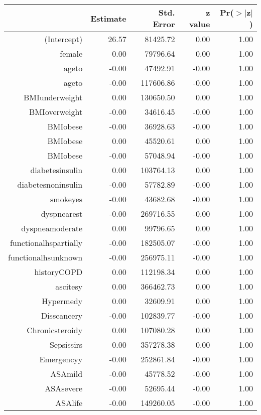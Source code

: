 \bigskip\bigskip
\centering
\begin{tabular}{rrrrr}
  \hline
 & Estimate & Std. Error & z value & Pr($>$$|$z$|$) \\ 
  \hline
(Intercept) & 26.57 & 81425.72 & 0.00 & 1.00 \\ 
  female & 0.00 & 79796.64 & 0.00 & 1.00 \\ 
  age\-65\-to\-74 & -0.00 & 47492.91 & -0.00 & 1.00 \\ 
  age\-75\-to\-84 & -0.00 & 117606.86 & -0.00 & 1.00 \\ 
  BMI\-underweight & 0.00 & 130650.50 & 0.00 & 1.00 \\ 
  BMI\-overweight & -0.00 & 34616.45 & -0.00 & 1.00 \\ 
  BMI\-obese\-1 & -0.00 & 36928.63 & -0.00 & 1.00 \\ 
  BMI\-obese\-2 & 0.00 & 45520.61 & 0.00 & 1.00 \\ 
  BMI\-obese\-3 & -0.00 & 57048.94 & -0.00 & 1.00 \\ 
  diabetes\-insulin & 0.00 & 103764.13 & 0.00 & 1.00 \\ 
  diabetes\-noninsulin & -0.00 & 57782.89 & -0.00 & 1.00 \\ 
  smoke\-yes & -0.00 & 43682.68 & -0.00 & 1.00 \\ 
  dyspnea\-rest & -0.00 & 269716.55 & -0.00 & 1.00 \\ 
  dyspnea\-moderate & 0.00 & 99796.65 & 0.00 & 1.00 \\ 
  functional\-hs\-partially & -0.00 & 182505.07 & -0.00 & 1.00 \\ 
  functional\-hs\-unknown & -0.00 & 256975.11 & -0.00 & 1.00 \\ 
  history\-COPD & 0.00 & 112198.34 & 0.00 & 1.00 \\ 
  ascites\-y & 0.00 & 366462.73 & 0.00 & 1.00 \\ 
  Hyper\-med\-y & 0.00 & 32609.91 & 0.00 & 1.00 \\ 
  Diss\-cancer\-y & -0.00 & 102839.77 & -0.00 & 1.00 \\ 
  Chronic\-steroid\-y & 0.00 & 107080.28 & 0.00 & 1.00 \\ 
  Sepsis\-sirs & 0.00 & 357278.38 & 0.00 & 1.00 \\ 
  Emergency\-y & -0.00 & 252861.84 & -0.00 & 1.00 \\ 
  ASA\-mild & -0.00 & 45778.52 & -0.00 & 1.00 \\ 
  ASA\-severe & -0.00 & 52695.44 & -0.00 & 1.00 \\ 
  ASA\-life & -0.00 & 149260.05 & -0.00 & 1.00 \\ 
   \hline
\end{tabular}

